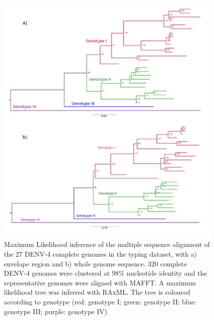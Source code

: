 \begin{figure}[h!]
\centering
\includegraphics[width=\textwidth]{figures/chapter 4/Figure S8.pdf}
\caption{Maximum Likelihood inference of the multiple sequence alignment of the 27 DENV-4 complete genomes in the typing dataset, with a) envelope region and b) whole genome sequence. 320 complete DENV-4 genomes were clustered at 98\% nucleotide identity and the representative genomes were aligned with MAFFT. A maximum likelihood tree was inferred with RAxML. The tree is coloured according to genotype (red: genotype I; green: genotype II; blue: genotype III; purple: genotype IV).}
\label{fig:chap4_figure_sup8}
\end{figure}